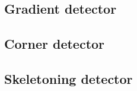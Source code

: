 \subsection{Gradient detector}



\subsection{Corner detector}



\subsection{Skeletoning detector}


